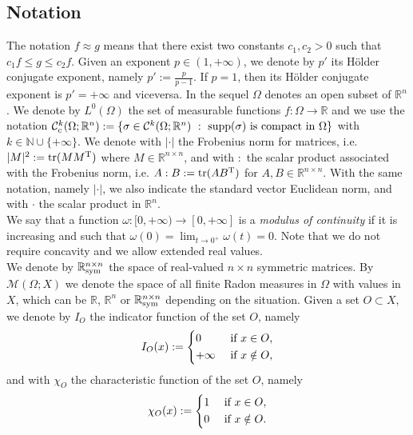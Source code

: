 \documentclass[a4paper,11pt,oneside,notitlepage]{article}
\numberwithin{equation}{section}
\def\R{\mathbb{R}}
\def\N{\mathbb{N}}
\def\M{\mathcal{M}}
\def\sym{{\rm sym}}
\def\supp{{\rm supp}}
\def\tr{{\rm tr}}
\newcommand{\T}{\textnormal{T}}
\newcommand{\st}{ \ : \ }
\begin{document}

\subsection{Notation}
\label{notation}

The notation $f \approx g$ means that there exist two constants $c_1, c_2 > 0$ such that $c_1 f \le  g \le c_2 f$. Given an exponent $p \in (1,+\infty)$, we denote by $p'$ its H\"older conjugate exponent, namely $p':=\frac{p}{p-1}$. If $p = 1$, then its H\"older conjugate exponent is $p' = +\infty$ and viceversa. In the sequel $\Omega$ denotes an open subset of $\mathbb R^n$. We denote by $L^0(\Omega)$ the set of measurable functions $f : \Omega \to \R$ and we use the notation $\mathcal{C}^k_c(\Omega; \R^n) := \{ \sigma \in \mathcal{C}^k(\Omega; \R^n) \st \supp(\sigma) \textnormal{ is compact in } \Omega \}$ with $k \in \N \cup \{+\infty\}$. We denote with $|\cdot|$ the Frobenius norm for matrices, i.e. $|M|^2 := \tr(M M^\T)$ where $M \in \R^{n \times n}$, and with $:$ the scalar product associated with the Frobenius norm, i.e. $A : B := \tr(A B^\T)$ for $A,B \in \R^{n \times n}$. With the same notation, namely $|\cdot|$, we also indicate the standard vector Euclidean norm, and with $\cdot$ the scalar product in $\R^n$.
\\
We say that a function $\omega: [0, +\infty) \to [0, +\infty]$ is a \textit{modulus of continuity} if it is increasing and such that $\omega(0) = \lim_{t \to 0^+} \omega(t)=0$. Note that we do not require concavity and we allow extended real values.
\\
We denote by $\R^{n \times n}_\sym$ the space of real-valued $n \times n$ symmetric matrices. By $\M(\Omega;X)$ we denote the space of all finite Radon measures in $\Omega$ with values in $X$, which can be $\R$, $\R^n$ or $\R^{n \times n}_\sym$ depending on the situation. Given a set $O \subset X$, we denote by $I_O$ the indicator function of the set $O$, namely
\begin{equation*}
    I_O(x) :=
    \begin{dcases}
        0 & \textnormal{ if } x \in O, \\
        + \infty & \textnormal{ if } x \notin O,
    \end{dcases}
\end{equation*}
and with $\chi_O$ the characteristic function of the set $O$, namely
\begin{equation*}
    \chi_O(x) :=
    \begin{dcases}
        1 & \textnormal{ if } x \in O, \\
        0 & \textnormal{ if } x \notin O.
    \end{dcases}
\end{equation*}
\end{document}
